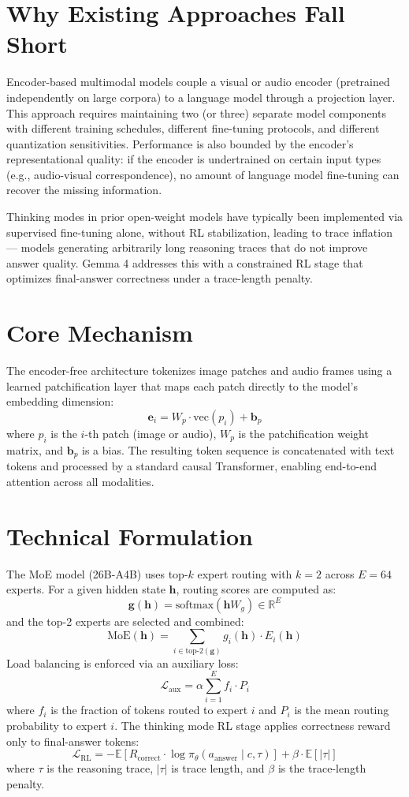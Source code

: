 \documentclass[10pt,twocolumn]{article}
\begin{document}
\section{Why Existing Approaches Fall Short}

Encoder-based multimodal models couple a visual or audio encoder
(pretrained independently on large corpora) to a language model
through a projection layer.
This approach requires maintaining two (or three) separate model
components with different training schedules, different fine-tuning
protocols, and different quantization sensitivities.
Performance is also bounded by the encoder's representational
quality: if the encoder is undertrained on certain input types
(e.g., audio-visual correspondence), no amount of language model
fine-tuning can recover the missing information.

Thinking modes in prior open-weight models have typically been
implemented via supervised fine-tuning alone, without RL stabilization,
leading to trace inflation --- models generating arbitrarily long
reasoning traces that do not improve answer quality.
Gemma 4 addresses this with a constrained RL stage that optimizes
final-answer correctness under a trace-length penalty.

\section{Core Mechanism}

The encoder-free architecture tokenizes image patches and audio
frames using a learned patchification layer that maps each patch
directly to the model's embedding dimension:
\[
\mathbf{e}_i = W_p \cdot \text{vec}(p_i) + \mathbf{b}_p
\]
where $p_i$ is the $i$-th patch (image or audio), $W_p$ is the
patchification weight matrix, and $\mathbf{b}_p$ is a bias.
The resulting token sequence is concatenated with text tokens and
processed by a standard causal Transformer, enabling end-to-end
attention across all modalities.

\section{Technical Formulation}

The MoE model (26B-A4B) uses top-$k$ expert routing with $k=2$
across $E=64$ experts.
For a given hidden state $\mathbf{h}$, routing scores are computed as:
\[
\mathbf{g}(\mathbf{h}) = \text{softmax}\!\left(\mathbf{h} W_g\right)
\in \mathbb{R}^E
\]
and the top-2 experts are selected and combined:
\[
\text{MoE}(\mathbf{h}) = \sum_{i \in \text{top-2}(\mathbf{g})}
  g_i(\mathbf{h}) \cdot E_i(\mathbf{h})
\]
Load balancing is enforced via an auxiliary loss:
\[
\mathcal{L}_{\text{aux}} = \alpha \sum_{i=1}^{E} f_i \cdot P_i
\]
where $f_i$ is the fraction of tokens routed to expert $i$
and $P_i$ is the mean routing probability to expert $i$.
The thinking mode RL stage applies correctness reward only to
final-answer tokens:
\[
\mathcal{L}_{\text{RL}} = -\mathbb{E}\!\left[R_{\text{correct}} \cdot
  \log \pi_\theta(a_{\text{answer}} \mid c, \tau)\right]
+ \beta \cdot \mathbb{E}[|\tau|]
\]
where $\tau$ is the reasoning trace, $|\tau|$ is trace length,
and $\beta$ is the trace-length penalty.
\end{document}
